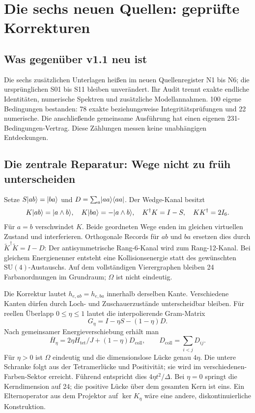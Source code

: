 \chapter{Die sechs neuen Quellen: geprüfte Korrekturen}
\label{ch:audit13}
\section{Was gegenüber v1.1 neu ist}
Die sechs zusätzlichen Unterlagen heißen im neuen Quellenregister N1 bis N6; die ursprünglichen S01 bis S11 bleiben unverändert. Ihr Audit trennt exakte endliche Identitäten, numerische Spektren und zusätzliche Modellannahmen. 100 eigene Bedingungen bestanden: 78 exakte beziehungsweise Integritätsprüfungen und 22 numerische. Die anschließende gemeinsame Ausführung hat einen eigenen 231-Bedingungen-Vertrag. Diese Zählungen messen keine unabhängigen Entdeckungen.

\section{Die zentrale Reparatur: Wege nicht zu früh unterscheiden}
Setze $S\lvert ab\rangle=\lvert ba\rangle$ und $D=\sum_a\lvert aa\rangle\langle aa\rvert$. Der Wedge-Kanal besitzt
\begin{equation}
K\lvert ab\rangle=\lvert a\wedge b\rangle,\quad K\lvert ba\rangle=-\lvert a\wedge b\rangle,\quad
K^\dagger K=I-S,\quad KK^\dagger=2I_6.
\end{equation}
Für $a=b$ verschwindet $K$. Beide geordneten Wege enden im gleichen virtuellen Zustand und interferieren. Orthogonale Records für $ab$ und $ba$ ersetzen dies durch $\widetilde K^\dagger\widetilde K=I-D$: Der antisymmetrische Rang-6-Kanal wird zum Rang-12-Kanal. Bei gleichem Energienenner entsteht eine Kollisionsenergie statt des gewünschten $\mathrm{SU}(4)$-Austauschs. Auf dem vollständigen Vierergraphen bleiben 24 Farbanordnungen im Grundraum; $\Omega$ ist nicht eindeutig.

Die Korrektur lautet $h_{e,ab}=h_{e,ba}$ innerhalb derselben Kante. Verschiedene Kanten dürfen durch Loch- und Zuschauerzustände unterscheidbar bleiben. Für reellen Überlapp $0\le\eta\le1$ lautet die interpolierende Gram-Matrix
\begin{equation}
G_\eta=I-\eta S-(1-\eta)D.
\end{equation}
Nach gemeinsamer Energieverschiebung erhält man
\begin{equation}
\overline H_\eta=2\eta H_{\mathrm{tet}}/J+(1-\eta)D_{\mathrm{coll}},
\qquad D_{\mathrm{coll}}=\sum_{i<j}D_{ij}.
\end{equation}
Für $\eta>0$ ist $\Omega$ eindeutig und die dimensionslose Lücke genau $4\eta$. Die untere Schranke folgt aus der Tetramerlücke und Positivität; sie wird im verschiedenen-Farben-Sektor erreicht. Führend entspricht dies $4\eta t^2/\Delta$. Bei $\eta=0$ springt die Kerndimension auf 24; die positive Lücke über dem gesamten Kern ist eins. Ein Elternoperator aus dem Projektor auf $\ker K_\eta$ wäre eine andere, diskontinuierliche Konstruktion.

